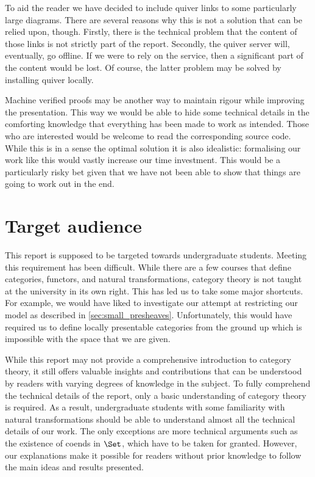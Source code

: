 To aid the reader we have decided to include quiver links to some particularly
large diagrams. There are several reasons why this is not a solution that can be
relied upon, though. Firstly, there is the technical problem that the content of
those links is not strictly part of the report. Secondly, the quiver server
will, eventually, go offline. If we were to rely on the service, then a
significant part of the content would be lost. Of course, the latter problem
may be solved by installing quiver locally.

Machine verified proofs may be another way to maintain rigour while improving
the presentation. This way we would be able to hide some technical details in the
comforting knowledge that everything has been made to work as intended.
Those who are interested would be welcome to read the corresponding source
code. While this is in a sense the optimal solution it is also idealistic:
formalising our work like this would vastly increase our time investment.
This would be a particularly risky bet given that we have not been able
to show that things are going to work out in the end.

\section{Target audience}

This report is supposed to be targeted towards undergraduate students. Meeting
this requirement has been difficult. While there are a few courses that define
categories, functors, and natural transformations, category theory is not taught
at the university in its own right. This has led us to take some major
shortcuts. For example, we would have liked to investigate our attempt at
restricting our model as described in \ref{sec:small_presheaves}. Unfortunately,
this would have required us to define locally presentable categories from the
ground up which is impossible with the space that we are given.

While this report may not provide a comprehensive introduction to category
theory, it still offers valuable insights and contributions that can be
understood by readers with varying degrees of knowledge in the subject. To
fully comprehend the technical details of the report, only a basic understanding of
category theory is required. As a result, undergraduate students with some
familiarity with natural transformations should be able to understand almost
all the technical details of our work. The only exceptions are more technical
arguments such as the existence of coends in $\Set$, which have to be taken for
granted. However, our explanations make it possible for readers without prior
knowledge to follow the main ideas and results presented.
